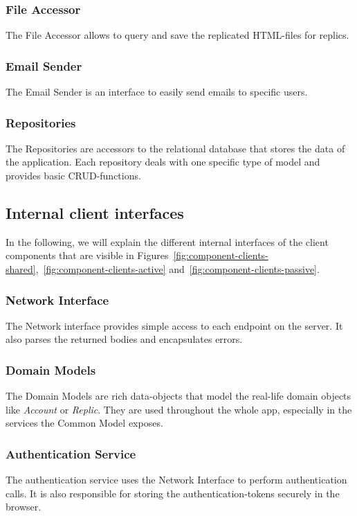 \subsubsection{File Accessor}
The File Accessor allows to query and save the replicated HTML-files for replics.

\subsubsection{Email Sender}
The Email Sender is an interface to easily send emails to specific users.

\subsubsection{Repositories}
The Repositories are accessors to the relational database that stores the data of the application. \newline
Each repository deals with one specific type of model and provides basic CRUD-functions.

\subsection{Internal client interfaces}\label{subsec:internal-client-interfaces}
In the following, we will explain the different internal interfaces of the client components that are visible in Figures~\ref{fig:component-clients-shared},~\ref{fig:component-clients-active} and~\ref{fig:component-clients-passive}.

\subsubsection{Network Interface}
The Network interface provides simple access to each endpoint on the server.
It also parses the returned bodies and encapsulates errors.

\subsubsection{Domain Models}
The Domain Models are rich data-objects that model the real-life domain objects like \textit{Account} or \textit{Replic}.
They are used throughout the whole app, especially in the services the Common Model exposes.

\subsubsection{Authentication Service}
The authentication service uses the Network Interface to perform authentication calls.
It is also responsible for storing the authentication-tokens securely in the browser.

